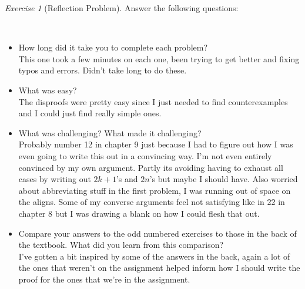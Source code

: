 \documentclass[12pt]{amsart}
\makeatletter
\theoremstyle{remark}
\newtheorem*{exercise}{Exercise}%
\renewenvironment{proof}[1][\proofname]{\par\doublespacing
  \pushQED{\qed}%
  \normalfont \topsep6\p@\@plus6\p@\relax
  \list{}{%
    \settowidth{\leftmargin}{\itshape\proofname:\hskip\labelsep}%
    \setlength{\labelwidth}{0pt}%
    \setlength{\itemindent}{-\leftmargin}%
  }%
  \item[\hskip\labelsep\itshape#1\@addpunct{:}]\ignorespaces
}{%
  \popQED\endlist\@endpefalse
  \singlespacing
}
\theoremstyle{mycomment}
\makeatother
\begin{document}
\begin{exercise}[Reflection Problem]
Answer the following questions:


\begin{proof} \ 


\begin{itemize}
\item How long did it take you to complete each problem? \\
  This one took a few minutes on each one, been trying to get better and fixing typos and errors. Didn't take long to do these.

\item What was easy?\\
The disproofs were pretty easy since I just needed to find counterexamples and I could just find really simple ones.

\item What was challenging? What made it challenging? \\
Probably number 12 in chapter 9 just because I had to figure out how I was even going to write this out in a convincing way. I'm not even entirely convinced by my own argument. Partly its avoiding having to exhaust all cases by writing out $2k+1$'s and $2n$'s but maybe I should have. Also worried about abbreviating stuff in the first problem, I was running out of space on the aligns. Some of my converse arguments feel not satisfying like in 22 in chapter 8 but I was drawing a blank on how I could flesh that out.

\item Compare your answers to the odd numbered exercises to those in the back of the textbook. What did you learn from this comparison? \\
I've gotten a bit inspired by some of the answers in the back, again a lot of the ones that weren't on the assignment helped inform how I should write the proof for the ones that we're in the assignment.

\end{itemize}\end{proof}
\end{exercise}









 
\end{document}
